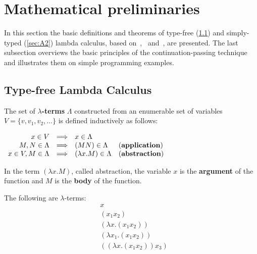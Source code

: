 \section{Mathematical preliminaries} \label{tex:math_prelim}

\cite{Church:1940:A-formulation-of-the-simple-theory-of-types}

In this section the basic definitions and theorems of type-free (\ref{sec:A1}) and simply-typed (\ref{sec:A2}) lambda calculus, based on~\cite{Barendregt:1981:The-Lambda-Calculus:-Its-Syntax-and-Semantics},~\cite{Barendregt:1992:Lambda-Calculi-with-Types} and~\cite{HindleySeldin:2008:Lambda-Calculus-and-Combinators-an-Introduction}, are presented. The last subsection overviews the basic principles of the continuation-passing technique and illustrates them on simple programming examples.

\subsection{Type-free Lambda Calculus} \label{sec:A1}

\begin{definition} The set of \textbf{$\lambda$-terms} $\Lambda$ constructed from an enumerable set of variables $V = \{ v, v_1 ,v_2, \dots\}$ is defined inductively as follows:
\begin{center}
$
\begin{array}{rcll}
x \in V & \Longrightarrow & x \in \Lambda &\\
M,N \in \Lambda &  \Longrightarrow & (MN) \in \Lambda & \text{(\textbf{application})}\\ 
 x \in V, M \in \Lambda&  \Longrightarrow  & (\lambda x.M) \in \Lambda & \text{(\textbf{abstraction})}
\end{array} 
$
\end{center}
\end{definition}

In the term $ (\lambda x.M)$, called abstraction, the variable $x$ is the \textbf{argument} of the function and $M$ is the \textbf{body} of the function. %

\begin{example} \label{app:ex1} The following are $\lambda$-terms:
\begin{align*}
& x \\
& (x_1x_2) \\
& (\lambda x. (x_1 x_2)) \\
& (\lambda x_1. (x_1 x_2)) \\
& ((\lambda x. (x_1 x_2)) x_3 ) 
\end{align*}
\end{example}


